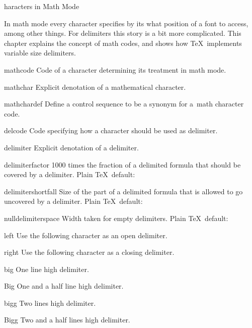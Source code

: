 \subject[mathchar] Characters in Math Mode

In math mode every character specifies by its
 what position of
a font to access, among other things.
For delimiters this story is a bit
more complicated. This chapter explains the concept
of math codes, and shows how \TeX\ implements variable
size delimiters.
 
\invent
\item mathcode 
      Code of a character determining its treatment in math mode.

\item mathchar 
      Explicit denotation of a mathematical character.

\item mathchardef 
      Define a control sequence to be a synonym for
      a~math character code.

\item delcode 
      Code specifying how a character should be used as delimiter.

\item delimiter 
      Explicit denotation of a delimiter.

\item delimiterfactor 
      1000 times the fraction of a delimited formula that should be
      covered by a delimiter.
      Plain \TeX\ default:~

\item delimitershortfall 
      Size of the part of a delimited formula that is allowed 
      to go uncovered by a delimiter.
      Plain \TeX\ default:~\n{5pt}

\item nulldelimiterspace 
      Width taken for empty delimiters. 
      Plain \TeX\ default:~\n{1.2pt}

\item left 
      Use the following character as an open delimiter.

\item right 
      Use the following character as a closing delimiter.

\item big 
      One line high delimiter.

\item Big 
      One and a half line high delimiter.

\item bigg 
      Two lines high delimiter.

\item Bigg 
      Two and a half lines high delimiter.

